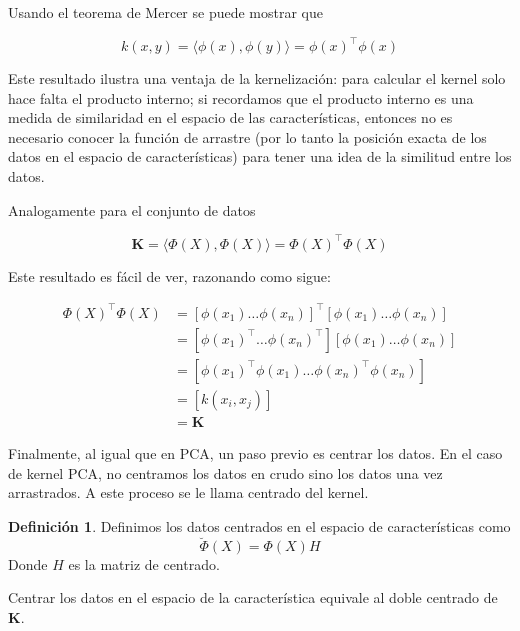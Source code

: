 \documentclass{article}
\numberwithin{equation}{section}
\theoremstyle{remark}
\theoremstyle{definition}
\newtheorem{definition}{Definición}
\theoremstyle{remark}
\theoremstyle{remark}
\begin{document}
Usando el teorema de Mercer se puede mostrar que

\begin{equation}
    \label{eq:dot_product_as_kernel_single}
    k(x,y) = \langle \phi(x), \phi(y) \rangle = \phi(x)^\intercal \phi(x)
\end{equation}

Este resultado ilustra una ventaja de la kernelización: para calcular el kernel 
solo hace falta el producto interno; si recordamos que el producto interno es una medida de 
similaridad en el espacio de las características, entonces no es necesario conocer la 
función de arrastre (por lo tanto la posición exacta de los datos en el espacio de características) 
para tener una idea de la similitud entre los datos.

Analogamente para el conjunto de datos

\begin{equation}
    \label{eq:dot_product_as_kernel_dataset}
    \bm{K} = \langle \Phi(X), \Phi(X) \rangle = \Phi(X)^\intercal \Phi(X)
\end{equation}

Este resultado es fácil de ver, razonando como sigue:

\begin{align*}
\Phi(X)^\intercal \Phi(X) &= [\phi(x_1) \ldots \phi(x_n)]^\intercal [\phi(x_1) \ldots \phi(x_n)] \\
        &= [\phi(x_1)^\intercal \ldots \phi(x_n)^\intercal][\phi(x_1) \ldots \phi(x_n)] \\
        &= [\phi(x_1)^\intercal \phi(x_1) \ldots \phi(x_n)^\intercal \phi(x_n)] \\
        &= [k(x_i, x_j)] \\
        &= \bm{K} 
\end{align*}

Finalmente, al igual que en PCA, un paso previo es centrar los datos. En el caso de kernel PCA, 
no centramos los datos en crudo sino los datos una vez arrastrados. A este proceso se le llama 
centrado del kernel.

\begin{definition}
    \label{df:feature_space_centered_data}
    Definimos los datos centrados en el espacio de características como
    $$\breve{\Phi}(X) = \Phi(X)H$$
    Donde $H$ es la matriz de centrado.
\end{definition}

Centrar los datos en el espacio de la característica equivale al doble centrado de $\bm{K}$.
\end{document}

